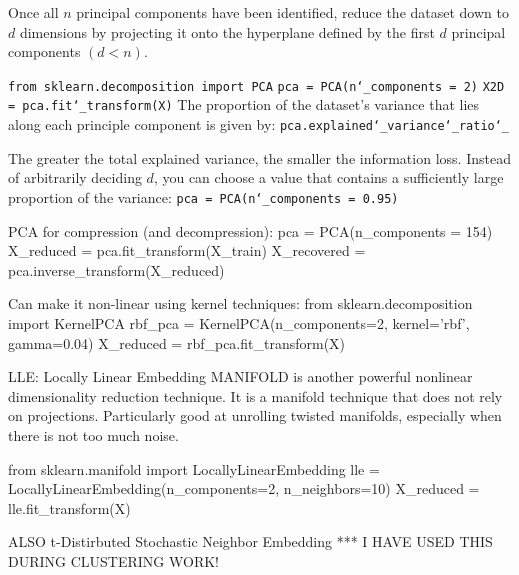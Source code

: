 \vspace{-3.0mm}
Once all $n$ principal components have been identified,
reduce the dataset down to $d$ dimensions
by projecting it onto the hyperplane defined by the first $d$ principal components $(d < n)$.

\texttt{from sklearn.decomposition import PCA}\newline
\texttt{pca = PCA(n\char`_components = 2)}\newline
\texttt{X2D = pca.fit\char`_transform(X)}\newline
The proportion of the dataset's variance that lies along each principle component is given by:\newline
\texttt{pca.explained\char`_variance\char`_ratio\char`_}

The greater the total explained variance,
the smaller the information loss.
Instead of arbitrarily deciding $d$,
you can choose a value that contains a sufficiently large proportion of the variance:\newline
\texttt{pca = PCA(n\char`_components = 0.95)}




PCA for compression (and decompression):
pca = PCA(n_components = 154)
X_reduced = pca.fit_transform(X_train)
X_recovered = pca.inverse_transform(X_reduced)

Can make it non-linear using kernel techniques:
from sklearn.decomposition import KernelPCA
rbf_pca = KernelPCA(n_components=2, kernel='rbf', gamma=0.04)
X_reduced = rbf_pca.fit_transform(X)



LLE: Locally Linear Embedding MANIFOLD
is another powerful nonlinear dimensionality reduction technique.
It is a manifold technique that does not rely on projections.
Particularly good at unrolling twisted manifolds, especially when there is not too much noise.

from sklearn.manifold import LocallyLinearEmbedding
lle = LocallyLinearEmbedding(n_components=2, n_neighbors=10)
X_reduced = lle.fit_transform(X)

ALSO t-Distirbuted Stochastic Neighbor Embedding
*** I HAVE USED THIS DURING CLUSTERING WORK!


































